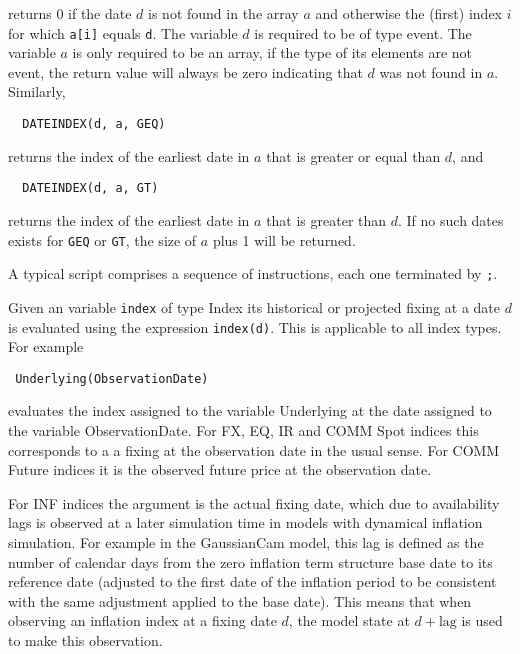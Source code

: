 returns $0$ if the date $d$ is not found in the array $a$ and otherwise the (first) index $i$ for which \verb+a[i]+
equals \verb+d+. The variable $d$ is required to be of type event. The variable $a$ is only required to be an array, if
the type of its elements are not event, the return value will always be zero indicating that $d$ was not found in
$a$. Similarly,

\begin{verbatim}
  DATEINDEX(d, a, GEQ)
\end{verbatim}

returns the index of the earliest date in $a$ that is greater or equal than $d$, and

\begin{verbatim}
  DATEINDEX(d, a, GT)
\end{verbatim}

returns the index of the earliest date in $a$ that is greater than $d$. If no such dates exists for \verb+GEQ+ or
\verb+GT+, the size of $a$ plus 1 will be returned.


A typical script comprises a sequence of instructions, each one terminated by {\tt ;}.

\label{index_evalop}

Given an variable \verb+index+ of type Index its historical or projected fixing at a date $d$ is evaluated using the
expression \verb+index(d)+. This is applicable to all index types. For example

\begin{verbatim}
 Underlying(ObservationDate)
\end{verbatim}

evaluates the index assigned to the variable Underlying at the date assigned to the variable ObservationDate. For FX,
EQ, IR and COMM Spot indices this corresponds to a a fixing at the observation date in the usual sense. For COMM Future
indices it is the observed future price at the observation date.

For INF indices the argument is the actual fixing date, which due to availability lags is observed at a later simulation
time in models with dynamical inflation simulation. For example in the GaussianCam model, this lag is defined as the
number of calendar days from the zero inflation term structure base date to its reference date (adjusted to the first
date of the inflation period to be consistent with the same adjustment applied to the base date). This means that when
observing an inflation index at a fixing date $d$, the model state at $d+\text{lag}$ is used to make this observation.

